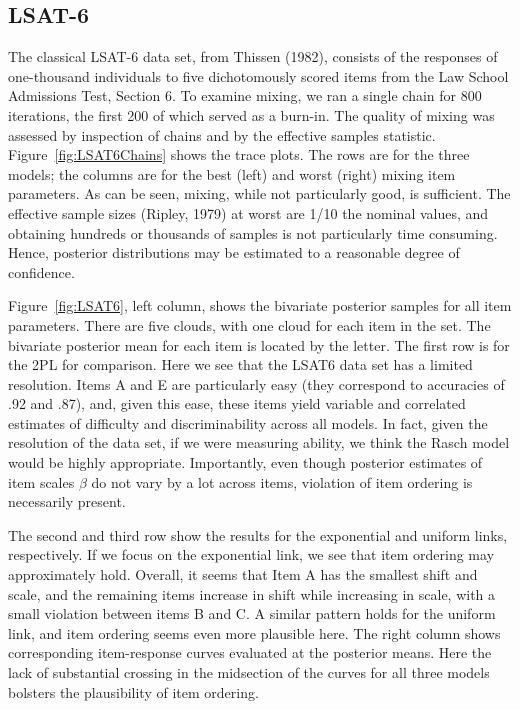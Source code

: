 \documentclass[english,,man]{apa6}
\begin{document}
\hypertarget{lsat-6}{%
\subsection{LSAT-6}\label{lsat-6}}

The classical LSAT-6 data set, from Thissen (1982), consists of the responses of one-thousand individuals to five dichotomously scored items from the Law School Admissions Test, Section 6. To examine mixing, we ran a single chain for 800 iterations, the first 200 of which served as a burn-in. The quality of mixing was assessed by inspection of chains and by the effective samples statistic. Figure~\ref{fig:LSAT6Chains} shows the trace plots. The rows are for the three models; the columns are for the best (left) and worst (right) mixing item parameters. As can be seen, mixing, while not particularly good, is sufficient. The effective sample sizes (Ripley, 1979) at worst are 1/10 the nominal values, and obtaining hundreds or thousands of samples is not particularly time consuming. Hence, posterior distributions may be estimated to a reasonable degree of confidence.

Figure~\ref{fig:LSAT6}, left column, shows the bivariate posterior samples for all item parameters. There are five clouds, with one cloud for each item in the set. The bivariate posterior mean for each item is located by the letter. The first row is for the 2PL for comparison. Here we see that the LSAT6 data set has a limited resolution. Items A and E are particularly easy (they correspond to accuracies of .92 and .87), and, given this ease, these items yield variable and correlated estimates of difficulty and discriminability across all models. In fact, given the resolution of the data set, if we were measuring ability, we think the Rasch model would be highly appropriate. Importantly, even though posterior estimates of item scales \(\beta\) do not vary by a lot across items, violation of item ordering is necessarily present.

The second and third row show the results for the exponential and uniform links, respectively. If we focus on the exponential link, we see that item ordering may approximately hold. Overall, it seems that Item A has the smallest shift and scale, and the remaining items increase in shift while increasing in scale, with a small violation between items B and C. A similar pattern holds for the uniform link, and item ordering seems even more plausible here. The right column shows corresponding item-response curves evaluated at the posterior means. Here the lack of substantial crossing in the midsection of the curves for all three models bolsters the plausibility of item ordering.
\end{document}
